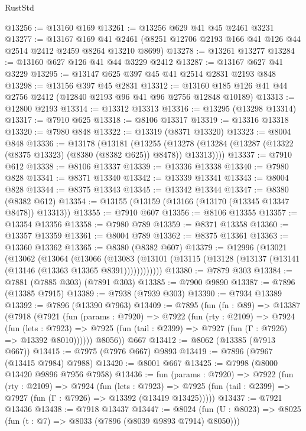 \begin{lexlean}{RustStd}
\begin{coremodule}
{\begin{coremodule}
{{{{{{{{{{{{{{{{{{{{{{{{{{{{{{{{{{{{{{{{{{{{{{{{{{@13256 := @13160 @169
@13261 := @13256 @629 @41 @45 @2461 @3231
@13277 := @13167
    @169
    @41
    @2461
    (@8251 @12706 @2193 @166 @41 @126 @44 @2514 @2412 @2459 @8264 @13210 @8699)
@13278 := @13261 @13277
@13284 := @13160 @627 @126 @41 @44 @3229 @2412
@13287 := @13167 @627 @41 @3229
@13295 := @13147 @625 @397 @45 @41 @2514 @2831 @2193 @848
@13298 := @13156 @397 @45 @2831
@13312 := @13160 @185 @126 @41 @44 @2756 @2412 (@12840 @2193 @96 @41 @96 @2756 @12848 @10189)
@13313 := @12800 @2193
@13314 := @13312 @13313
@13316 := @13295 (@13298 @13314)
@13317 := @7910 @625
@13318 := @8106 @13317
@13319 := @13316 @13318
@13320 := @7980 @848
@13322 := @13319 (@8371 @13320)
@13323 := @8004 @848
@13336 := @13178
    (@13181
      (@13255 (@13278 (@13284 (@13287 (@13322 (@8375 @13323) (@8380 (@8382 @625)) @8478)) @13313))))
@13337 := @7910 @612
@13338 := @8106 @13337
@13339 := @13336 @13338
@13340 := @7980 @828
@13341 := @8371 @13340
@13342 := @13339 @13341
@13343 := @8004 @828
@13344 := @8375 @13343
@13345 := @13342 @13344
@13347 := @8380 (@8382 @612)
@13354 := @13155 (@13159 (@13166 (@13170 (@13345 @13347 @8478)) @13313))
@13355 := @7910 @607
@13356 := @8106 @13355
@13357 := @13354 @13356
@13358 := @7980 @789
@13359 := @8371 @13358
@13360 := @13357 @13359
@13361 := @8004 @789
@13362 := @8375 @13361
@13363 := @13360 @13362
@13365 := @8380 (@8382 @607)
@13379 := @12996
    (@13021
      (@13062
        (@13064
          (@13066
            (@13083 (@13101 (@13115 (@13128 (@13137 (@13141 (@13146 (@13363 @13365 @8391))))))))))))
@13380 := @7879 @303
@13384 := @7881 (@7885 @303) (@7891 @303)
@13385 := @7900 @9890
@13387 := @7896 (@13385 @7915)
@13389 := @7938 (@7939 @303)
@13390 := @7934 @13389
@13392 := @7896 (@13390 @7963)
@13409 := @7895
    (fun (fn : @89) =>
    @13387
      (@7918
        (@7921
          (fun (params : @7920) =>
          @7922
            (fun (rty : @2109) =>
            @7924
              (fun (lets : @7923) =>
              @7925 (fun (tail : @2399) => @7927 (fun (Γ : @7926) => @13392 @8010))))))
        @8056))
    @667
@13412 := @8062 (@13385 (@7913 @667))
@13415 := @7975 (@7976 @667) @9893
@13419 := @7896 (@7967 (@13415 @7984) @7988)
@13420 := @8001 @667
@13425 := @7998 (@8000 @13420 @9896 @7956 @7958)
@13436 := fun (params : @7920) =>
  @7922
    (fun (rty : @2109) =>
    @7924
      (fun (lets : @7923) =>
      @7925 (fun (tail : @2399) => @7927 (fun (Γ : @7926) => @13392 (@13419 @13425)))))
@13437 := @7921 @13436
@13438 := @7918 @13437
@13447 := @8024 (fun (U : @8023) => @8025 (fun (t : @7) => @8033 (@7896 (@8039 @9893 @7914) @8050)))
}}}}}}}}}}}}}}}}}}}}}}}}}}}}}}}}}}}}}}}}}}}}}}}}}}
\end{coremodule}}
\end{coremodule}
\end{lexlean}
